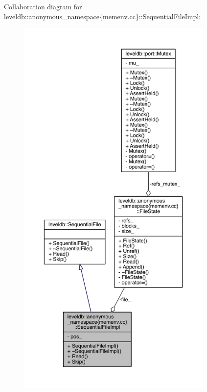 Collaboration diagram for leveldb\+:\+:anonymous\+\_\+namespace\{memenv.\+cc\}\+:\+:Sequential\+File\+Impl\+:
\nopagebreak
\begin{figure}[H]
\begin{center}
\leavevmode
\includegraphics[height=550pt]{classleveldb_1_1anonymous__namespace_02memenv_8cc_03_1_1_sequential_file_impl__coll__graph}
\end{center}
\end{figure}

